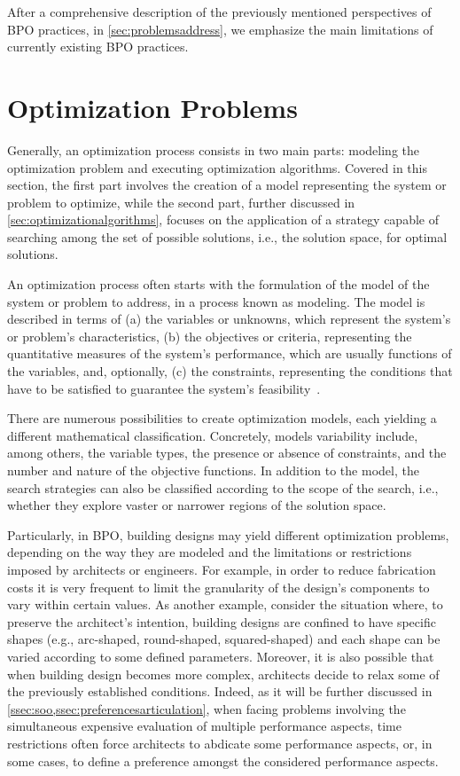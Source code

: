 	After a comprehensive description of the previously mentioned perspectives of \ac{BPO} practices, in \cref{sec:problemsaddress}, we emphasize the main limitations of currently existing \ac{BPO} practices. 
	
\section{Optimization Problems}
\label{sec:optimizationproblems}
	
	Generally, an optimization process consists in two main parts: modeling the optimization problem and executing optimization algorithms. Covered in this section, the first part involves the creation of a model representing the system or problem to optimize, while the second part, further discussed in \cref{sec:optimizationalgorithms}, focuses on the application of a strategy capable of searching among the set of possible solutions, i.e., the solution space, for optimal solutions.
	
	An optimization process often starts with the formulation of the model of the system or problem to address, in a process known as modeling. The model is described in terms of (a) the variables or unknowns, which represent the system's or problem's characteristics, (b) the objectives or criteria, representing the quantitative measures of the system's performance, which are usually functions of the variables, and, optionally, (c) the constraints, representing the conditions that have to be satisfied to guarantee the system's feasibility~\cite{Nocedal2011NumericalOptimization}. 
		
	There are numerous possibilities to create optimization models, each yielding a different mathematical classification. Concretely, models variability include, among others, the variable types, the presence or absence of constraints, and the number and nature of the objective functions. In addition to the model, the search strategies can also be classified according to the scope of the search, i.e., whether they explore vaster or narrower regions of the solution space. 
	
	Particularly, in \ac{BPO}, building designs may yield different optimization problems, depending on the way they are modeled and the limitations or restrictions imposed by architects or engineers. For example, in order to reduce fabrication costs it is very frequent to limit the granularity of the design's components to vary within certain values. As another example, consider the situation where, to preserve the architect's intention, building designs are confined to have specific shapes (e.g., arc-shaped, round-shaped, squared-shaped) and each shape can be varied according to some defined parameters. Moreover, it is also possible that when building design becomes more complex, architects decide to relax some of the previously established conditions. Indeed, as it will be further discussed in \cref{ssec:soo,ssec:preferencesarticulation}, when facing problems involving the simultaneous expensive evaluation of multiple performance aspects, time restrictions often force architects to abdicate some performance aspects, or, in some cases, to define a preference amongst the considered performance aspects.
	
